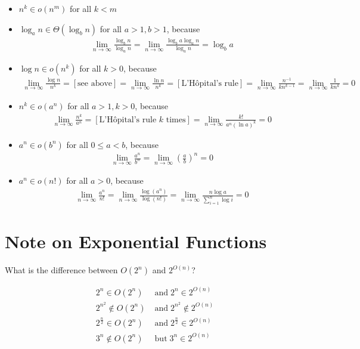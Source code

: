 \documentclass[a4paper]{report}
\theoremstyle{definition}
\begin{document}
\begin{itemize}
\item $n^k \in o(n^m)$ for all $k < m$
\item $\log_a n \in \Theta(\log_b n)$ for all $a > 1, b > 1$, because\\
  \begin{align*}
    \lim_{n \to \infty}\frac{\log_b n}{\log_a n} = \lim_{n \to \infty}\frac{\log_b a \log_a n}{\log_a n} = \log_b a
  \end{align*}
\item $\log n \in o(n^k)$ for all $k > 0$, because\\
  \begin{align*}
    \lim_{n \to \infty}\frac{\log n}{n^k} = [\text{see above}] = \lim_{n \to \infty}\frac{\ln n}{n^k} = [\text{L'H\^opital's rule}] = \lim_{n \to \infty}\frac{n^{-1}}{kn^{k-1}} = \lim_{n \to \infty}\frac{1}{kn^{k}} = 0
  \end{align*}
\item $n^k \in o(a^n)$ for all $a > 1, k > 0$, because\\
  \begin{align*}
    \lim_{n \to \infty}\frac{n^k}{a^n} = [\text{L'H\^opital's rule $k$ times}] = \lim_{n \to \infty}\frac{k!}{a^n (\ln a)^k} = 0
  \end{align*}
\item $a^n \in o(b^n)$ for all $0 \leq a < b$, because\\
  \begin{align*}
    \lim_{n \to \infty}\frac{a^n}{b^n} = \lim_{n \to \infty}\left(\frac{a}{b}\right)^n = 0
  \end{align*}  
\item $a^n \in o(n!)$ for all $a > 0$, because\\
  \begin{align*}
    \lim_{n \to \infty}\frac{a^n}{n!} = \lim_{n \to \infty}\frac{\log(a^n)}{\log(n!)} = \lim_{n \to \infty}\frac{n \log a}{\sum_{i=1}^{n}\log i} = 0
  \end{align*}  
\end{itemize}


\section{Note on Exponential Functions}
What is the difference between $O(2^n)$ and $2^{O(n)}$?

\begin{align*}
2^n \in O(2^{n}) \;&\text{and}\; 2^n \in 2^{O(n)}\\
2^{n^2} \not\in O(2^{n}) \;&\text{and}\; 2^{n^2} \not\in 2^{O(n)}\\
2^{\frac{n}{2}} \in O(2^{n}) \;&\text{and}\; 2^{\frac{n}{2}} \in 2^{O(n)}\\
3^{n} \not\in O(2^{n}) \;&\text{but}\; 3^{n} \in 2^{O(n)}
\end{align*}
\end{document}
